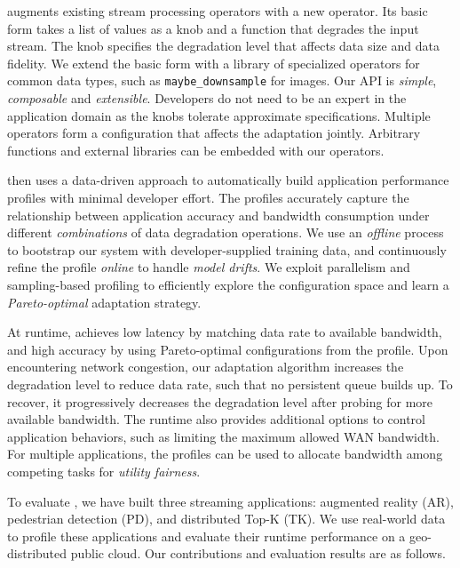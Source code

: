 \sysname{} augments existing stream processing operators with a new \maybe{}
operator. Its basic form takes a list of values as a knob and a function that
degrades the input stream. The knob specifies the degradation level that affects
data size and data fidelity. We extend the basic form with a library of
specialized operators for common data types, such as \texttt{maybe\_downsample}
for images. Our API is \textit{simple}, \textit{composable} and
\textit{extensible}. Developers do not need to be an expert in the application
domain as the knobs tolerate approximate specifications. Multiple operators form
a configuration that affects the adaptation jointly. Arbitrary functions and
external libraries can be embedded with our operators.

\sysname{} then uses a data-driven approach to automatically build application
performance profiles with minimal developer effort. The profiles accurately
capture the relationship between application accuracy and bandwidth consumption
under different \textit{combinations} of data degradation operations. We use an
\textit{offline} process to bootstrap our system with developer-supplied
training data, and continuously refine the profile \textit{online} to handle
\textit{model drifts}. We exploit parallelism and sampling-based profiling to
efficiently explore the configuration space and learn a \textit{Pareto-optimal}
adaptation strategy.

At runtime, \sysname{} achieves low latency by matching data rate to available
bandwidth, and high accuracy by using Pareto-optimal configurations from the
profile. Upon encountering network congestion, our adaptation algorithm
increases the degradation level to reduce data rate, such that no persistent
queue builds up. To recover, it progressively decreases the degradation level
after probing for more available bandwidth. The runtime also provides additional
options to control application behaviors, such as limiting the maximum allowed
WAN bandwidth. For multiple applications, the profiles can be used to allocate
bandwidth among competing tasks for \textit{utility fairness}.

To evaluate \sysname{}, we have built three streaming applications: augmented
reality (AR), pedestrian detection (PD), and distributed Top-K (TK). We use
real-world data to profile these applications and evaluate their runtime
performance on a geo-distributed public cloud. Our contributions and evaluation
results are as follows.

